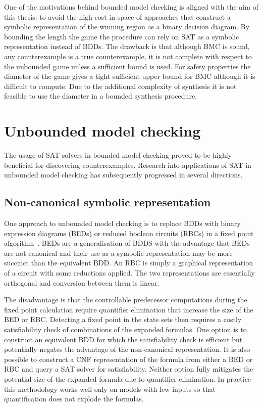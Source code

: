 One of the motivations behind bounded model checking is aligned with the aim of this thesis: to avoid the high cost in space of approaches that construct a symbolic representation of the winning region as a binary decision diagram. By bounding the length the game the procedure can rely on SAT as a symbolic representation instead of BDDs. The drawback is that although BMC is sound, any counterexample is a true counterexample, it is not complete with respect to the unbounded game unless a sufficient bound is used. For safety properties the diameter of the game gives a tight sufficient upper bound for BMC although it is difficult to compute. Due to the additional complexity of synthesis it is not feasible to use the diameter in a bounded synthesis procedure.

\section{Unbounded model checking}

The usage of SAT solvers in bounded model checking proved to be highly beneficial for discovering counterexamples. Research into applications of SAT in unbounded model checking has subsequently progressed in several directions.

\subsection{Non-canonical symbolic representation}

One approach to unbounded model checking is to replace BDDs with binary expression diagrams (BEDs) or reduced boolean circuits (RBCs) in a fixed point algorithm~\cite{Williams00, Abdulla00}. BEDs are a generalisation of BDDS with the advantage that BEDs are not canonical and their use as a symbolic representation may be more succinct than the equivalent BDD. An RBC is simply a graphical representation of a circuit with some reductions applied. The two representations are essentially orthogonal and conversion between them is linear.

The disadvantage is that the controllable predecessor computations during the fixed point calculation require quantifier elimination that increase the size of the BED or RBC. Detecting a fixed point in the state sets then requires a costly satisfiability check of combinations of the expanded formulas. One option is to construct an equivalent BDD for which the satisfiability check is efficient but potentially negates the advantage of the non-canonical representation. It is also possible to construct a CNF representation of the formula from either a BED or RBC and query a SAT solver for satisfiability. Neither option fully mitigates the potential size of the expanded formula due to quantifier elimination. In practice this methodology works well only on models with few inputs so that quantification does not explode the formulas.

